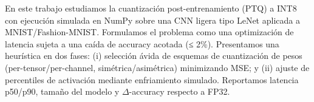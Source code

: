 En este trabajo estudiamos la cuantización post-entrenamiento (PTQ) a INT8
con ejecución simulada en NumPy sobre una CNN ligera tipo LeNet aplicada a MNIST/Fashion-MNIST.
Formulamos el problema como una optimización de latencia sujeta a una caída de accuracy
acotada (≤ 2\%). Presentamos una heurística en dos fases: (i) selección ávida de
esquemas de cuantización de pesos (per-tensor/per-channel, simétrica/asimétrica) minimizando MSE;
y (ii) ajuste de percentiles de activación mediante enfriamiento simulado.
Reportamos latencia p50/p90, tamaño del modelo y $\Delta$-accuracy respecto a FP32.
